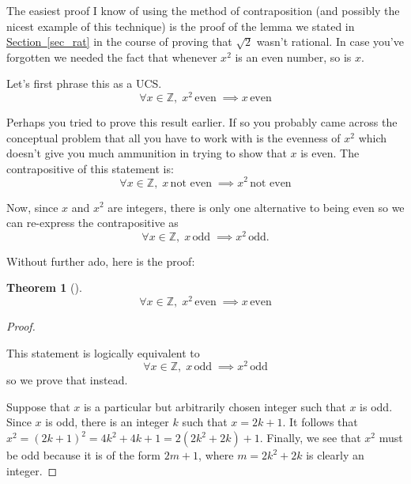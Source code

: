 \documentclass[10pt,]{book}
\theoremstyle{plain}
\newtheorem{theorem}{Theorem}[section]
\theoremstyle{definition}
\theoremstyle{definition}
\numberwithin{equation}{section}
\newcommand{\Integers}{{\mathbb Z}}
\begin{document}
    The easiest proof I know of using the method of contraposition (and possibly
    the nicest example of this technique)
    is the proof of the lemma we stated in \hyperref[sec_rat]{Section~\ref{sec_rat}} in the course
    of proving that \(\sqrt{2}\) wasn't rational. In case you've forgotten
    we needed the fact that whenever \(x^2\) is an even number, so is \(x\).
\par

    Let's first phrase this as a UCS.
    \begin{equation*}
      \forall x \in \Integers, \; x^2 \, \mbox{even}  \; \implies x \, \mbox{even}
    \end{equation*}
\par

    Perhaps you tried to prove this result earlier. If so you probably
    came across the conceptual problem that all you have to work with
    is the evenness of \(x^2\) which doesn't give you much ammunition
    in trying to show that \(x\) is even. The contrapositive of this
    statement is:
    \begin{equation*}
      \forall x \in \Integers, \; x \, \mbox{not even}  \; 
      \implies x^2 \, \mbox{not even}
    \end{equation*}
\par

    Now, since \(x\) and \(x^2\) are integers, there is only one alternative to being
    even \textemdash{} so we can re-express the contrapositive as
    \begin{equation*}
      \forall x \in \Integers, \; x \, \mbox{odd}  \; \implies x^2 \, \mbox{odd} .
    \end{equation*}
\par

    Without further ado, here is the proof:
\begin{theorem}[{}]\label{theorem-8}
\begin{equation*}
        \forall x \in \Integers, \; x^2 \, \mbox{even}  \; 
        \implies x \, \mbox{even}
      \end{equation*}\end{theorem}
\begin{proof}\hypertarget{proof-12}{}

      This statement is logically equivalent to
      \begin{equation*}
        \forall x \in \Integers, \; x \, \mbox{odd}  \; \implies x^2 \, \mbox{odd}
      \end{equation*}
      so we prove that instead.
\par

      Suppose that \(x\) is a particular but arbitrarily chosen integer
      such that \(x\) is odd. Since \(x\) is odd, there is an integer \(k\) such that
      \(x=2k+1\). It follows that
      \(x^2 = (2k + 1)^2 = 4k^2 + 4k + 1 = 2(2k^2 + 2k) + 1\).
      Finally, we see that \(x^2\) must be odd because it is of the form \(2m+1\), where
      \(m = 2k^2 + 2k\) is clearly an integer.
\end{proof}
\par
\end{document}
